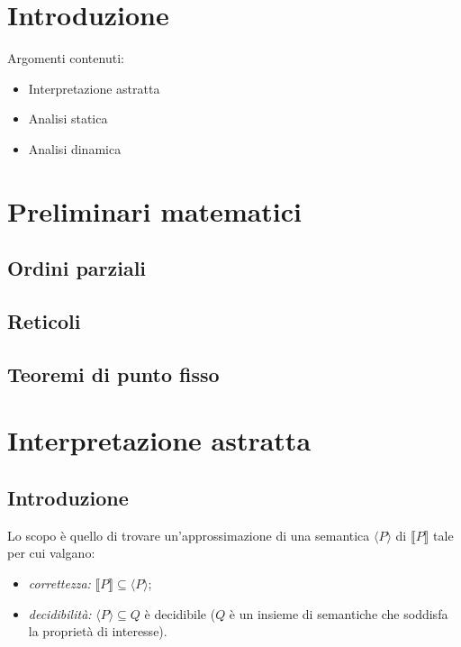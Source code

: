 \documentclass[a4paper, 11pt]{article}
\begin{document}
	\begin{frontespizio}
		\Preambolo{\usepackage{datetime}}
		\Scuola{}
	\end{frontespizio}
	
	\tableofcontents
	\newpage
	
	\section{Introduzione}
	Argomenti contenuti:
	\begin{itemize}
		\item Interpretazione astratta
		\item Analisi statica
		\item Analisi dinamica
	\end{itemize}

	\section{Preliminari matematici}
	\subsection{Ordini parziali}
	\subsection{Reticoli}
	\subsection{Teoremi di punto fisso}
	
	\section{Interpretazione astratta}
	\subsection{Introduzione}
	Lo scopo è quello di trovare un'approssimazione di una semantica $\langle P \rangle$ di $\llbracket P \rrbracket$ tale per cui valgano:
	\begin{itemize}
		\item \textit{correttezza:} $\llbracket P \rrbracket \subseteq \langle P \rangle$;
		\item \textit{decidibilità:} $\langle P \rangle \subseteq Q$ è decidibile ($Q$ è un insieme di semantiche che soddisfa la proprietà di interesse).
	\end{itemize}
\end{document}
